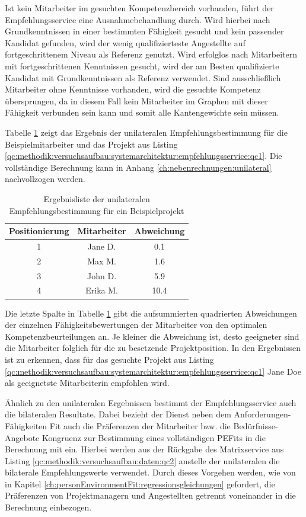 Ist kein Mitarbeiter im gesuchten Kompetenzbereich vorhanden, führt der Empfehlungsservice eine Ausnahmebehandlung durch. Wird hierbei nach Grundkenntnissen in einer bestimmten Fähigkeit gesucht und kein passender Kandidat gefunden, wird der wenig qualifizierteste Angestellte auf fortgeschrittenem Niveau als Referenz genutzt. Wird erfolglos nach Mitarbeitern mit fortgeschrittenen Kenntnissen gesucht, wird der am Besten qualifizierte Kandidat mit Grundkenntnissen als Referenz verwendet. Sind ausschließlich Mitarbeiter ohne Kenntnisse vorhanden, wird die gesuchte Kompetenz übersprungen, da in diesem Fall kein Mitarbeiter im Graphen mit dieser Fähigkeit verbunden sein kann und somit alle Kantengewichte \nullWert sein müssen.

Tabelle \ref{tbl:methodik:versuchsaufbau:unilateral:tbl2} zeigt das Ergebnis der unilateralen Empfehlungsbestimmung für die Beispielmitarbeiter und das Projekt aus Listing \ref{qc:methodik:versuchsaufbau:systemarchitektur:empfehlungsservice:qc1}. Die vollständige Berechnung kann in Anhang \ref{ch:nebenrechnungen:unilateral} nachvollzogen werden.

\begin{table}[h]
	\centering
	\begin{tabular}{c|c|c}
		\textbf{Positionierung} & \textbf{Mitarbeiter} & \textbf{Abweichung}\\
		\hline
		1 & Jane D.  & 0.1\\
		2 & Max M.   & 1.6\\
		3 & John D.  & 5.9\\
		4 & Erika M. & 10.4
	\end{tabular}
	\caption{Ergebnisliste der unilateralen Empfehlungsbestimmung für ein Beispielprojekt}
	\label{tbl:methodik:versuchsaufbau:unilateral:tbl2}
\end{table}

Die letzte Spalte in Tabelle \ref{tbl:methodik:versuchsaufbau:unilateral:tbl2} gibt die aufsummierten quadrierten Abweichungen der einzelnen Fähigkeitsbewertungen der Mitarbeiter von den optimalen Kompetenzbeurteilungen an. Je kleiner die Abweichung ist, desto geeigneter sind die Mitarbeiter folglich für die zu besetzende Projektposition. In den Ergebnissen ist zu erkennen, dass für das gesuchte Projekt aus Listing \ref{qc:methodik:versuchsaufbau:systemarchitektur:empfehlungsservice:qc1} Jane Doe als geeignetste Mitarbeiterin empfohlen wird.

Ähnlich zu den unilateralen Ergebnissen bestimmt der Empfehlungsservice auch die bilateralen Resultate. Dabei bezieht der Dienst neben dem Anforderungen-Fähigkeiten Fit auch die Präferenzen der Mitarbeiter bzw. die Bedürfnisse-Angebote Kongruenz zur Bestimmung eines vollständigen \acp{PEFit} in die Berechnung mit ein. Hierbei werden aus der Rückgabe des Matrixservice aus Listing \ref{qc:methodik:versuchsaufbau:daten:qc2} anstelle der unilateralen die bilaterale Empfehlungswerte verwendet. Durch dieses Vorgehen werden, wie von \textcite[S. 51ff.]{edwards:1991} in Kapitel \ref{ch:personEnvironmentFit:regressionsgleichungen} gefordert, die Präferenzen von Projektmanagern und Angestellten getrennt voneinander in die Berechnung einbezogen.

